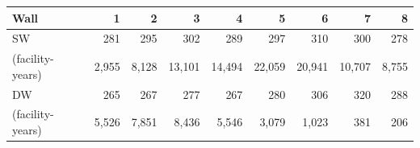 \begin{tabular}{lrrrrrrrr}
\toprule
Wall & 1 & 2 & 3 & 4 & 5 & 6 & 7 & 8 \\
\midrule
SW & 281 & 295 & 302 & 289 & 297 & 310 & 300 & 278 \\
(facility-years) & 2,955 & 8,128 & 13,101 & 14,494 & 22,059 & 20,941 & 10,707 & 8,755 \\
DW & 265 & 267 & 277 & 267 & 280 & 306 & 320 & 288 \\
(facility-years) & 5,526 & 7,851 & 8,436 & 5,546 & 3,079 & 1,023 & 381 & 206 \\
\bottomrule
\end{tabular}
